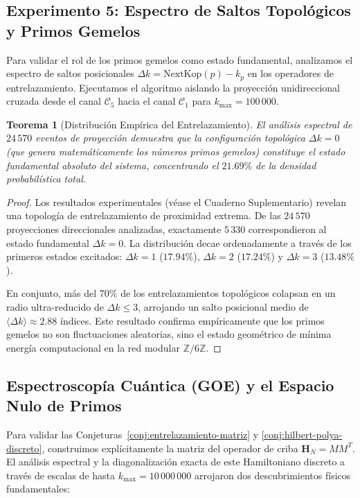 \documentclass{article}
\numberwithin{equation}{section}
\theoremstyle{plain}
\newtheorem{theorem}{Teorema}[section]
\theoremstyle{definition}
\begin{document}
\subsection{Experimento 5: Espectro de Saltos Topológicos y Primos Gemelos}

Para validar el rol de los primos gemelos como estado fundamental, analizamos el espectro de saltos posicionales $\Delta k = \mathrm{NextKop}(p) - k_p$ en los operadores de entrelazamiento. Ejecutamos el algoritmo aislando la proyección unidireccional cruzada desde el canal $\mathcal{C}_5$ hacia el canal $\mathcal{C}_1$ para $k_{\max} = 100\,000$.

\begin{theorem}[Distribución Empírica del Entrelazamiento]
\label{thm:distribucion-gemelos}
El análisis espectral de $24\,570$ eventos de proyección demuestra que la configuración topológica $\Delta k = 0$ (que genera matemáticamente los números primos gemelos) constituye el estado fundamental absoluto del sistema, concentrando el $21.69\%$ de la densidad probabilística total.
\end{theorem}

\begin{proof}
Los resultados experimentales (véase el Cuaderno Suplementario) revelan una topología de entrelazamiento de proximidad extrema. De las $24\,570$ proyecciones direccionales analizadas, exactamente $5\,330$ correspondieron al estado fundamental $\Delta k = 0$. La distribución decae ordenadamente a través de los primeros estados excitados: $\Delta k = 1$ ($17.94\%$), $\Delta k = 2$ ($17.24\%$) y $\Delta k = 3$ ($13.48\%$). 

En conjunto, más del $70\%$ de los entrelazamientos topológicos colapsan en un radio ultra-reducido de $\Delta k \le 3$, arrojando un salto posicional medio de $\langle \Delta k \rangle \approx 2.88$ índices. Este resultado confirma empíricamente que los primos gemelos no son fluctuaciones aleatorias, sino el estado geométrico de mínima energía computacional en la red modular $\mathbb{Z}/6\mathbb{Z}$.
\end{proof}

\subsection{Espectroscopía Cuántica (GOE) y el Espacio Nulo de Primos}
\label{subsec:exp6-espectroscopia}

Para validar las Conjeturas~\ref{conj:entrelazamiento-matriz} y \ref{conj:hilbert-polya-discreto}, construimos explícitamente la matriz del operador de criba $\mathbf{H}_N = M M^T$. El análisis espectral y la diagonalización exacta de este Hamiltoniano discreto a través de escalas de hasta $k_{\max} = 10\,000\,000$ arrojaron dos descubrimientos físicos fundamentales:
\end{document}
